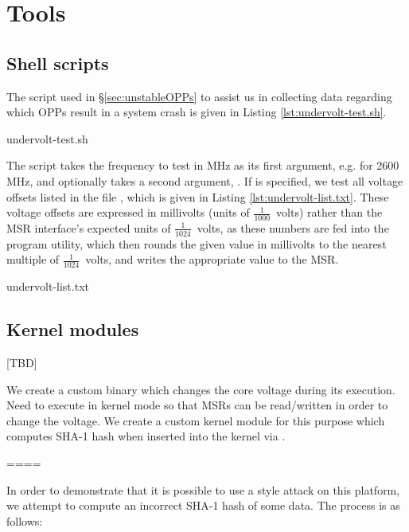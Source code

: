\section{Tools}
\label{sec:tools}

\subsection{Shell scripts}
\label{sec:undervolt-test.sh}

The script used in §\ref{sec:unstableOPPs} to assist us in collecting data
regarding which OPPs result in a system crash is given in Listing
\ref{lst:undervolt-test.sh}.


    {undervolt-test.sh}

The script takes the frequency to test in MHz as its first argument, e.g.
 for 2600 MHz, and optionally takes a second argument, .
If  is specified, we test all voltage offsets listed in the file
, which is given in Listing \ref{lst:undervolt-list.txt}.
These voltage offsets are expressed in millivolts (units of
$\frac{1}{1000}$~volts) rather than the MSR interface's expected units of
$\frac{1}{1024}$~volts, as these numbers are fed into the 
program utility, which then rounds the given value in millivolts to the nearest
multiple of $\frac{1}{1024}$~volts, and writes the appropriate value to the MSR.


    {undervolt-list.txt}

\subsection{Kernel modules}

[TBD]

We create a custom  binary which changes the core voltage during its
execution.
Need to execute in kernel mode so that MSRs can be read/written in order to
change the voltage.
We create a custom kernel module for this purpose which computes SHA-1 hash
when inserted into the kernel via .

====

In order to demonstrate that it is possible to use a \clkscrew{} style attack
on this platform, we attempt to compute an incorrect SHA-1 hash of some data.
The process is as follows:

